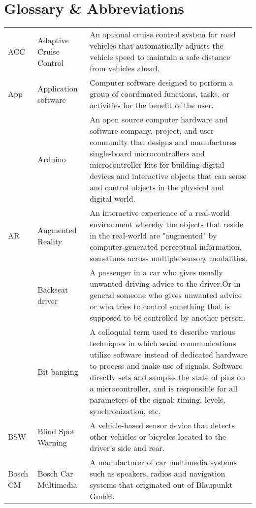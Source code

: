 \chapter*{Glossary \& Abbreviations}
\label{ch:glossary}

\newcolumntype{b}{X}

\begin{table}[ht!]
\renewcommand{\arraystretch}{1.5}
\begin{tabularx}{\textwidth}{smb}
ACC & Adaptive Cruise Control & An optional cruise control system for road vehicles that automatically adjusts the vehicle speed to maintain a safe distance from vehicles ahead. \\
App & Application software & Computer software designed to perform a group of coordinated functions, tasks, or activities for the benefit of the user. \\
 & Arduino & An open source computer hardware and software company, project, and user community that designs and manufactures single-board microcontrollers and microcontroller kits for building digital devices and interactive objects that can sense and control objects in the physical and digital world. \\
AR & Augmented Reality & An interactive experience of a real-world environment whereby the objects that reside in the real-world are "augmented" by computer-generated perceptual information, sometimes across multiple sensory modalities. \\
 & Backseat driver & A passenger in a car who gives usually unwanted driving advice to the driver.Or in general someone who gives unwanted advice or who tries to control something that is supposed to be controlled by another person. \\
 & Bit banging & A colloquial term used to describe various techniques in which serial communications utilize software instead of dedicated hardware to process and make use of signals. Software directly sets and samples the state of pins on a microcontroller, and is responsible for all parameters of the signal: timing, levels, synchronization, etc. \\
BSW & Blind Spot Warning & A vehicle-based sensor device that detects other vehicles or bicycles located to the driver’s side and rear. \\
Bosch CM & Bosch Car Multimedia & A manufacturer of car multimedia systems such as speakers, radios and navigation systems that originated out of Blaupunkt GmbH. \\

 
 \end{tabularx}
\end{table}

